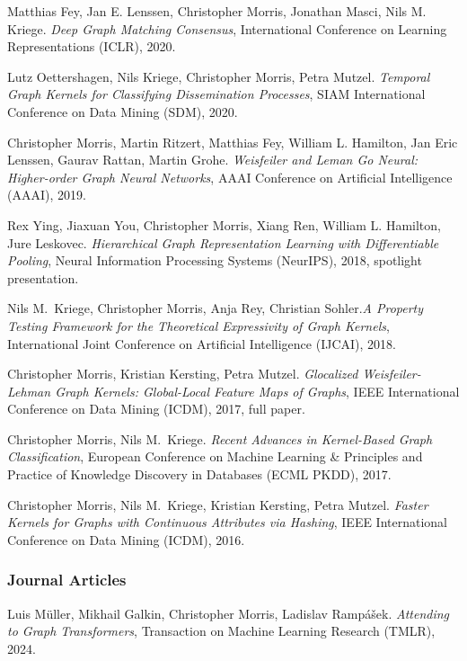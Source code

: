 \documentclass[11pt, a4paper, DIV=14, headings=small]{scrartcl}
\begin{document}
\begin{thebibliography}{15}
		Matthias Fey, Jan E. Lenssen, Christopher Morris, Jonathan Masci, Nils M. Kriege.
		\emph{Deep Graph Matching Consensus},
		International Conference on Learning Representations (ICLR), 2020.
		
		Lutz Oettershagen, Nils Kriege, Christopher Morris, Petra Mutzel.
		\emph{Temporal Graph Kernels for Classifying Dissemination Processes},
		SIAM International Conference on Data Mining (SDM), 2020.
		
		Christopher Morris, Martin Ritzert, Matthias Fey, William L. Hamilton, Jan Eric Lenssen, Gaurav Rattan, Martin Grohe.
		\newblock \emph{Weisfeiler and Leman Go Neural: Higher-order Graph Neural Networks},
		\newblock AAAI Conference on Artificial Intelligence (AAAI), 2019.
		
		Rex Ying, Jiaxuan You, Christopher Morris, Xiang Ren, William L. Hamilton, Jure Leskovec.
		\emph{Hierarchical Graph Representation Learning with Differentiable Pooling},
		Neural Information Processing Systems (NeurIPS), 2018, spotlight presentation.
		
		Nils M.~Kriege, Christopher Morris, Anja Rey, Christian Sohler.\footnotemark[2]
		\emph{A Property Testing Framework for the Theoretical Expressivity of Graph Kernels},
		International Joint Conference on Artificial Intelligence (IJCAI), 2018.
		
		Christopher Morris, Kristian Kersting, Petra Mutzel.
		\emph{Glocalized Weisfeiler-Lehman Graph Kernels: Global-Local Feature Maps of Graphs},
		IEEE International Conference on Data Mining (ICDM), 2017, full paper.
		
		Christopher Morris, Nils M.~Kriege.
		\emph{Recent Advances in Kernel-Based Graph Classification},
		European Conference on Machine Learning \& Principles and Practice of Knowledge Discovery in Databases (ECML PKDD), 2017.
		
		Christopher Morris, Nils M.~Kriege, Kristian Kersting, Petra Mutzel.
		\emph{Faster Kernels for Graphs with Continuous Attributes via Hashing},
		IEEE International Conference on Data Mining (ICDM), 2016.
		
		\subsubsection*{Journal Articles}
		
		Luis Müller, Mikhail Galkin, Christopher Morris, Ladislav Rampášek.
		\emph{Attending to Graph Transformers}, Transaction on Machine Learning Research (TMLR), 2024.		
		

\end{thebibliography}
\end{document}
